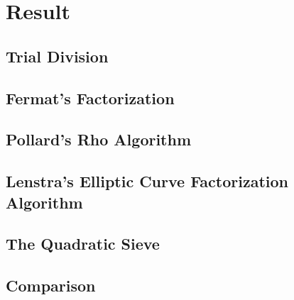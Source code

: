 \chapter{Result}

\section{Trial Division}
\label{TrialDivision}


\section{Fermat's Factorization}
\label{FermatsFactorization}


\section{Pollard's Rho Algorithm}
\label{PollardsRhoAlgorithm}


\section{Lenstra's Elliptic Curve Factorization Algorithm}
\label{LenstrasEllipticCurve}


\section{The Quadratic Sieve}
\label{QuadraticSieve}


\section{Comparison}
\label{Comparison}

